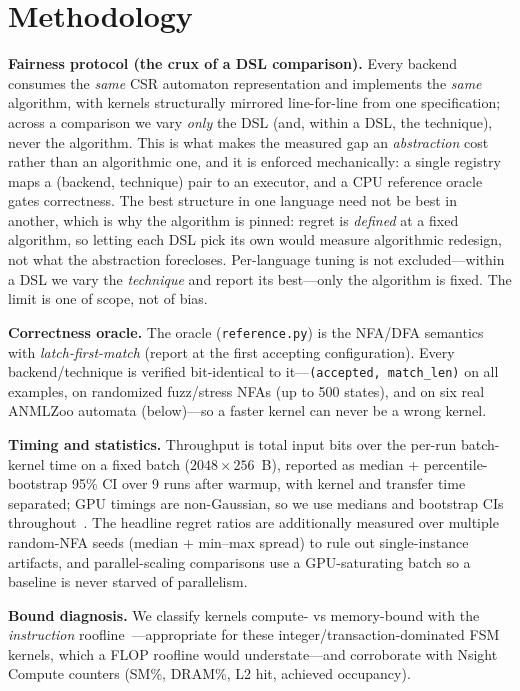 \documentclass[conference]{IEEEtran}
\begin{document}
\section{Methodology}\label{sec:method}
\textbf{Fairness protocol (the crux of a DSL comparison).} Every backend consumes the
\emph{same} CSR automaton representation and implements the \emph{same} algorithm, with kernels
structurally mirrored line-for-line from one specification; across a comparison we vary
\emph{only} the DSL (and, within a DSL, the technique), never the algorithm. This is what makes
the measured gap an \emph{abstraction} cost rather than an algorithmic one, and it is enforced
mechanically: a single registry maps a (backend, technique) pair to an executor, and a CPU
reference oracle gates correctness.
The best structure in one language need not be best in another, which is why the algorithm is
pinned: regret is \emph{defined} at a fixed algorithm, so letting each DSL pick its own would
measure algorithmic redesign, not what the abstraction forecloses. Per-language tuning is not
excluded---within a DSL we vary the \emph{technique} and report its best---only the algorithm is
fixed. The limit is one of scope, not of bias.

\textbf{Correctness oracle.} The oracle (\texttt{reference.py}) is the NFA/DFA semantics with
\emph{latch-first-match} (report at the first accepting configuration). Every backend/technique
is verified bit-identical to it---\texttt{(accepted, match\_len)} on all examples, on randomized
fuzz/stress NFAs (up to 500 states), and on six real ANMLZoo automata (below)---so a faster
kernel can never be a wrong kernel.

\textbf{Timing and statistics.} Throughput is total input bits over the per-run batch-kernel
time on a fixed batch ($2048\times256$~B), reported as median + percentile-bootstrap 95\% CI
over 9 runs after warmup, with kernel and transfer time separated; GPU timings are
non-Gaussian, so we use medians and bootstrap CIs throughout~\cite{hoefler}. The headline
regret ratios are additionally measured over multiple random-NFA seeds (median + min--max
spread) to rule out single-instance artifacts, and parallel-scaling comparisons use a
GPU-saturating batch so a baseline is never starved of parallelism.

\textbf{Bound diagnosis.} We classify kernels compute- vs memory-bound with the
\emph{instruction} roofline~\cite{instrroofline,roofline}---appropriate for these
integer/transaction-dominated FSM kernels, which a FLOP roofline would understate---and
corroborate with Nsight Compute counters (SM\%, DRAM\%, L2 hit, achieved occupancy).
\end{document}
